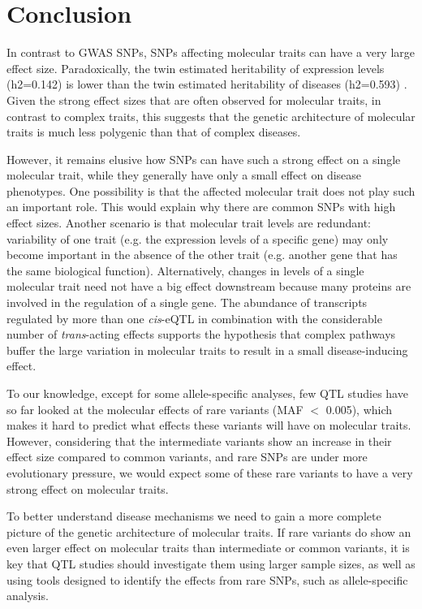 \section{Conclusion}
In contrast to GWAS SNPs, SNPs affecting molecular traits can have a very large effect size. Paradoxically, the twin estimated heritability of expression levels (h2=0.142) \cite{wrightHeritabilityGenomicsGene2014} is lower than the twin estimated heritability of diseases (h2=0.593) \cite{poldermanMetaanalysisHeritabilityHuman2015}. Given the strong effect sizes that are often observed for molecular traits, in contrast to complex traits, this suggests that the genetic architecture of molecular traits is much less polygenic than that of complex diseases. 

However, it remains elusive how SNPs can have such a strong effect on a single molecular trait, while they generally have only a small effect on disease phenotypes. One possibility is that the affected molecular trait does not play such an important role. This would explain why there are common SNPs with high effect sizes. Another scenario is that molecular trait levels are redundant: variability of one trait (e.g. the expression levels of a specific gene) may only become important in the absence of the other trait (e.g. another gene that has the same biological function). Alternatively, changes in levels of a single molecular trait need not have a big effect downstream because many proteins are involved in the regulation of a single gene. The abundance of transcripts regulated by more than one \textit{cis}-eQTL in combination with the considerable number of \textit{trans}-acting effects supports the hypothesis that complex pathways buffer the large variation in molecular traits to result in a small disease-inducing effect.

To our knowledge, except for some allele-specific analyses, few QTL studies have so far looked at the molecular effects of rare variants (MAF $<$ 0.005), which makes it hard to predict what effects these variants will have on molecular traits. However, considering that the intermediate variants show an increase in their effect size compared to common variants, and rare SNPs are under more evolutionary pressure, we would expect some of these rare variants to have a very strong effect on molecular traits.

To better understand disease mechanisms we need to gain a more complete picture of the genetic architecture of molecular traits. If rare variants do show an even larger effect on molecular traits than intermediate or common variants, it is key that QTL studies should investigate them using larger sample sizes, as well as using tools designed to identify the effects from rare SNPs, such as allele-specific analysis. 


